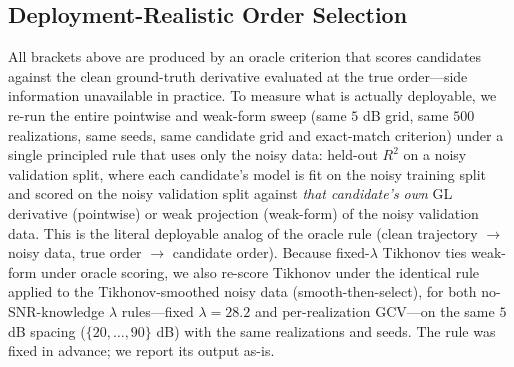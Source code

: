 \documentclass[review,3p,times]{elsarticle}
\begin{document}
\subsection{Deployment-Realistic Order Selection}
\label{sec:realistic}
All brackets above are produced by an oracle criterion that scores candidates against the clean ground-truth derivative evaluated at the true order---side information unavailable in practice. To measure what is actually deployable, we re-run the entire pointwise and weak-form sweep (same $5$ dB grid, same $500$ realizations, same seeds, same candidate grid and exact-match criterion) under a single principled rule that uses only the noisy data: held-out $R^2$ on a noisy validation split, where each candidate's model is fit on the noisy training split and scored on the noisy validation split against \emph{that candidate's own} GL derivative (pointwise) or weak projection (weak-form) of the noisy validation data. This is the literal deployable analog of the oracle rule (clean trajectory $\to$ noisy data, true order $\to$ candidate order). Because fixed-$\lambda$ Tikhonov ties weak-form under oracle scoring, we also re-score Tikhonov under the identical rule applied to the Tikhonov-smoothed noisy data (smooth-then-select), for both no-SNR-knowledge $\lambda$ rules---fixed $\lambda = 28.2$ and per-realization GCV---on the same $5$ dB spacing ($\{20,\dots,90\}$ dB) with the same realizations and seeds. The rule was fixed in advance; we report its output as-is.
\end{document}
